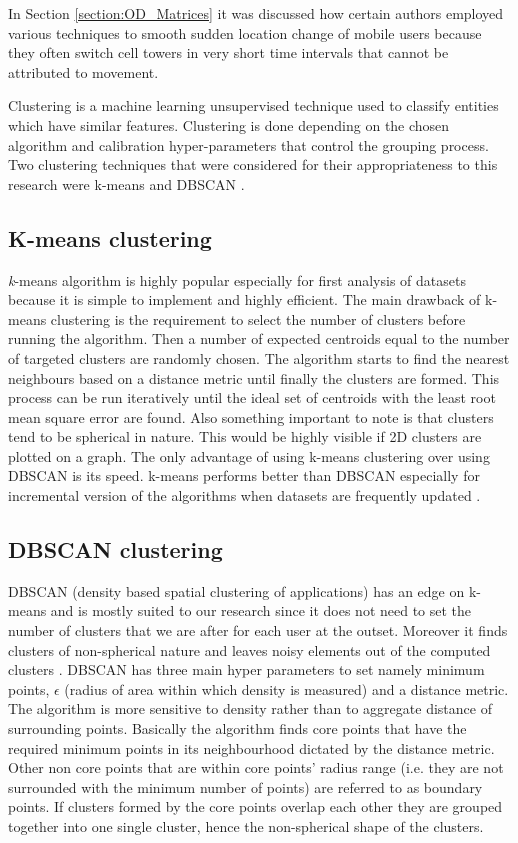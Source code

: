 \documentclass[12pt, a4paper]{report}
\theoremstyle{definition}
\theoremstyle{definition}%
\theoremstyle{definition}%
\theoremstyle{definition}%
\theoremstyle{definition}%
\theoremstyle{definition}%
\begin{document}
In Section \ref{section:OD_Matrices} it was discussed how certain authors employed various techniques to smooth sudden location change of mobile users because they often switch cell towers in very short time intervals that cannot be attributed to movement. 
 
Clustering is a machine learning unsupervised technique used to classify entities which have similar features. Clustering is done depending on the chosen algorithm and calibration hyper-parameters that control the grouping process. Two clustering techniques that were considered for their appropriateness to this research were k-means and DBSCAN \cite{ChakrabortyNKNagwaniLopamudraDey2011,huang2017research}. 

\subsection{K-means clustering} \label{subsection:methodology:kmeans_clustering}
\textit{k}-means algorithm is highly popular especially for first analysis of datasets because it is simple to implement and highly efficient. The main drawback of k-means clustering is the requirement to select the number of clusters before running the algorithm. Then a number of expected centroids equal to the number of targeted clusters are randomly chosen. The algorithm starts to find the nearest neighbours based on a distance metric until finally the clusters are formed. This process can be run iteratively until the ideal set of centroids with the least root mean square error are found. Also something important to note is that clusters tend to be spherical in nature. This would be highly visible if 2D clusters are plotted on a graph. The only advantage of using k-means clustering over using DBSCAN is its speed. k-means performs better than DBSCAN especially for incremental version of the algorithms when datasets are frequently updated \cite{ChakrabortyNKNagwaniLopamudraDey2011}.

\subsection{DBSCAN clustering}  \label{subsection:methodology:dbscan_clustering}
DBSCAN (density based spatial clustering of applications) has an edge on k-means and is mostly suited to our research since it does not need to set the number of clusters that we are after for each user at the outset. Moreover it finds clusters of non-spherical nature and leaves noisy elements out of the computed clusters \cite{ChakrabortyNKNagwaniLopamudraDey2011}. DBSCAN has three main hyper parameters to set namely minimum points,  $\epsilon$ (radius of area within which density is measured)  and a distance metric. The algorithm is more sensitive to density rather than to aggregate distance of surrounding points. Basically the algorithm finds core points that have the required minimum points in its neighbourhood dictated by the distance metric. Other non core points that are within core points' radius range (i.e. they are not surrounded with the minimum number of points) are referred to as boundary points. If clusters formed by the core points overlap each other they are grouped together into one single cluster, hence the non-spherical shape of the clusters.
\end{document}
